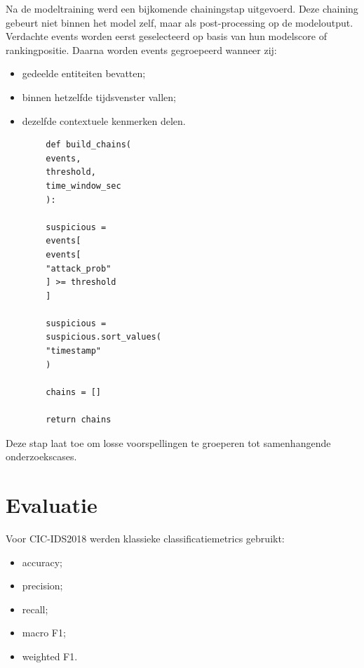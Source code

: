Na de modeltraining werd een bijkomende chainingstap uitgevoerd.
\newline
\newline
Deze chaining gebeurt niet binnen het model zelf, maar als post-processing op de modeloutput.
\newline
\newline
Verdachte events worden eerst geselecteerd op basis van hun modelscore of rankingpositie.
\newline
\newline
Daarna worden events gegroepeerd wanneer zij:
\begin{itemize}
    \item gedeelde entiteiten bevatten;
    \item binnen hetzelfde tijdsvenster vallen;
    \item dezelfde contextuele kenmerken delen.
\end{itemize}

\begin{listing}[H]
    \begin{verbatim}
        def build_chains(
        events,
        threshold,
        time_window_sec
        ):
        
        suspicious =
        events[
        events[
        "attack_prob"
        ] >= threshold
        ]
        
        suspicious =
        suspicious.sort_values(
        "timestamp"
        )
        
        chains = []
        
        return chains
    \end{verbatim}
    
    \caption[Threat chaining]
    {Vereenvoudigde chaininglogica.}
    
    \label{code:threat-chaining}
\end{listing}

Deze stap laat toe om losse voorspellingen te groeperen tot samenhangende onderzoekscases.

\section{Evaluatie}

Voor CIC-IDS2018 werden klassieke classificatiemetrics gebruikt:
\begin{itemize}
    \item accuracy;
    \item precision;
    \item recall;
    \item macro F1;
    \item weighted F1.
\end{itemize}

